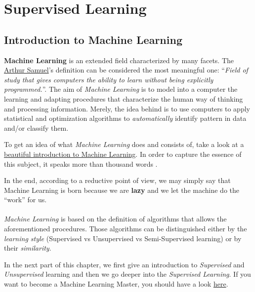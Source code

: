 

\section{Supervised Learning}

\subsection{Introduction to Machine Learning}

{\bf Machine Learning} is an extended field characterized by many facets. The  \href{https://en.wikipedia.org/wiki/Arthur\_Samuel}{Arthur Samuel}'s definition can be considered the most meaningful one: ``{\it Field of study that gives computers the ability to learn without being explicitly programmed.}''. The aim of \emph{Machine Learning} is to model into a computer the learning and adapting procedures that characterize the human way of thinking and processing information. Merely, the idea behind is to use computers to apply statistical and optimization algorithms to \emph{automatically} identify pattern in data and/or classify them. 

To get an idea of what \emph{Machine Learning} does and consists of, take a look at a \href{http://www.r2d3.us/visual-intro-to-machine-learning-part-1/}{beautiful introduction to Machine Learning}. In order to capture the essence of this subject, it speaks more than thousand words . 

In the end, according to a reductive point of view, we may simply say that Machine Learning is born because we are \textbf{lazy} and we let the machine do the ``work'' for us. 
\\\\
\emph{Machine Learning} is based on the definition of algorithms that allows the aforementioned procedures. Those algorithms can be distinguished either by the \emph{learning style} (Supervised vs Unsupervised vs Semi-Supervised learning) or by their \emph{similarity}. 

In the next part of this chapter, we first give an introduction to \emph{Supervised} and \emph{Unsupervised} learning and then we go deeper into the \emph{Supervised Learning}. If you want to become a Machine Learning Master, you should have a look \href{http://machinelearningmastery.com/}{here}.

